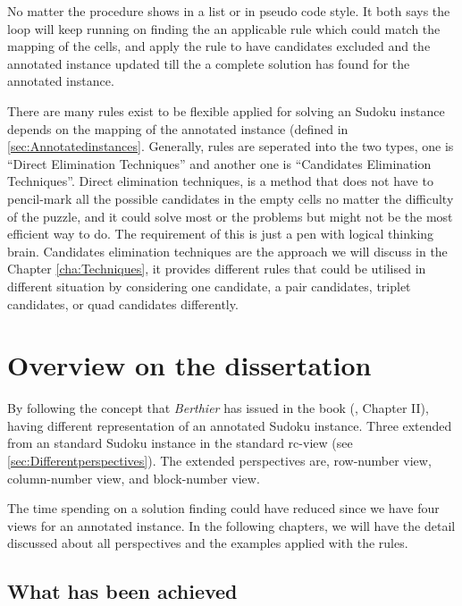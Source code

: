 \documentclass[11pt]{report}
\begin{document}
No matter the procedure shows in a list or in pseudo code style. It both says the loop will keep running on finding the an applicable rule which could match the mapping of the cells, and apply the rule to have candidates excluded and the annotated instance updated till the a complete solution has found for the annotated instance.

There are many rules exist to be flexible applied for solving an Sudoku instance depends on the mapping of the annotated instance (defined in \ref{sec:Annotatedinstances}. Generally, rules are seperated into the two types, one is ``Direct Elimination Techniques'' and another one is ``Candidates Elimination Techniques''. Direct elimination techniques, is a method that does not have to pencil-mark all the possible candidates in the empty cells no matter the difficulty of the puzzle, and it could solve most or the problems but might not be the most efficient way to do. The requirement of this is just a pen with logical thinking brain. Candidates elimination techniques are the approach we will discuss in the Chapter \ref{cha:Techniques}, it provides different rules that could be utilised in different situation by considering one candidate, a pair candidates, triplet candidates, or quad candidates differently.




\section{Overview on the dissertation}
\label{sec:overview}

By following the concept that \emph{Berthier} has issued in the book (\cite{Berthier2007Sudoku}, Chapter II), having different representation of an annotated Sudoku instance. Three extended from an standard Sudoku instance in the standard rc-view (see \ref{sec:Differentperspectives}). The extended perspectives are, row-number view, column-number view, and block-number view.

The time spending on a solution finding could have reduced since we have four views for an annotated instance. In the following chapters, we will have the detail discussed about all perspectives and the examples applied with the rules.

\subsection{What has been achieved}
\label{sec:whatachieved}
\end{document}
